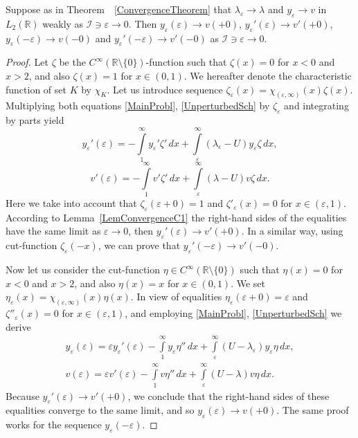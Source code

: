\documentclass[11pt,english]{amsart}
\begin{document}
\begin{g_lemma}\label{LemmmaYe(eps)}
Suppose as in Theorem~~\ref{ConvergenceTheorem} that $\lambda_\varepsilon\to \lambda$ and $y_\varepsilon \to v$ in $L_2(\mathbb{R})$ weakly as $\mathcal{I}\ni \varepsilon\to 0$.
Then $y_\varepsilon(\varepsilon)\to v(+0)$, $y_\varepsilon'(\varepsilon)\to v'(+0)$, $y_\varepsilon(-\varepsilon)\to v(-0)$ and $y_\varepsilon'(-\varepsilon)\to v'(-0)$ as $\mathcal{I}\ni \varepsilon\to 0$.
\end{g_lemma}
\begin{proof}
Let $\zeta$ be the $C^\infty(\mathbb{R}\setminus \{0\})$-function such that $\zeta(x)=0$ for $x<0$ and $x> 2$, and also $\zeta(x)=1$ for $x\in (0,1)$. We hereafter denote the characteristic function of set $K$ by $\chi_K$. Let us introduce  sequence   $\zeta_\varepsilon(x)=\chi_{(\varepsilon,\infty)}(x)\zeta(x)$. Multiplying both equations \eqref{MainProbl}, \eqref{UnperturbedSch} by $\zeta_\varepsilon$ and integrating by parts yield
$$
y_\varepsilon'(\varepsilon)=-\int\limits^{\infty}_1y_\varepsilon'\zeta'\,dx+
\int\limits^{\infty}_\varepsilon(\lambda_\varepsilon-U)y_\varepsilon\zeta\,dx,
$$
$$
v'(\varepsilon)=-\int\limits^{\infty}_1v'\zeta'\,dx+
\int\limits^{\infty}_\varepsilon(\lambda-U)v\zeta\,dx.
$$
Here we take into account that $\zeta_\varepsilon(\varepsilon+0)=1$ and $\zeta'_\varepsilon(x)=0$ for $x\in (\varepsilon,1)$. According to Lemma~\ref{LemConvergenceC1}
the right-hand sides of the equalities have the same limit as $\varepsilon\to 0$, then $y_\varepsilon'(\varepsilon)\to v'(+0)$.
In a similar way, using  cut-function $\zeta_\varepsilon(-x)$, we can prove that $y_\varepsilon'(-\varepsilon)\to v'(-0)$.

Now let us consider the cut-function $\eta\in C^\infty(\mathbb{R}\setminus \{0\})$ such that $\eta(x)=0$ for $x<0$ and $x>2$, and also $\eta(x)=x$ for $x\in (0,1)$. We set $\eta_\varepsilon(x)=\chi_{(\varepsilon,\infty)}(x)\eta(x)$. In view of equalities $\eta_\varepsilon(\varepsilon+0)=\varepsilon$ and $\zeta''_\varepsilon(x)=0$ for $x\in (\varepsilon,1)$, and employing  \eqref{MainProbl}, \eqref{UnperturbedSch} we derive
\begin{gather*}
y_\varepsilon(\varepsilon)=\varepsilon y_\varepsilon'(\varepsilon)
-\int\limits^{\infty}_1y_\varepsilon\eta''\,dx+
\int\limits^{\infty}_\varepsilon(U-\lambda_\varepsilon)y_\varepsilon\eta\,dx,\\[5pt]
v(\varepsilon)=\varepsilon v'(\varepsilon)-\int\limits^{\infty}_1v\eta''\,dx+
\int\limits^{\infty}_\varepsilon(U-\lambda)v\eta\,dx.
\end{gather*}
Because $y_\varepsilon'(\varepsilon)\to v'(+0)$, we conclude that  the right-hand sides of these equalities converge to the same limit, and so $y_\varepsilon(\varepsilon)\to v(+0)$.
The same proof works for the sequence $y_\varepsilon(-\varepsilon)$.
\end{proof}
\end{document}
